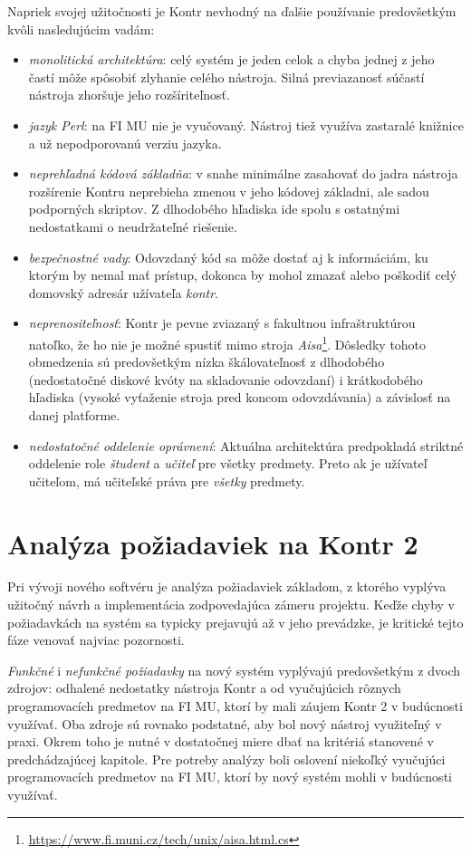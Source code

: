 \documentclass[
  digital, %
  twoside, %
  table,   %
  lof,     %
  lot,     %
]{fithesis3}
\begin{document}
Napriek svojej užitočnosti je Kontr nevhodný na ďalšie používanie predovšetkým kvôli nasledujúcim vadám:
\begin{itemize}
    \item \emph{monolitická architektúra}: celý systém je jeden celok a chyba jednej z jeho častí môže spôsobiť zlyhanie celého nástroja. Silná previazanosť súčastí nástroja zhoršuje jeho rozšíriteľnosť.
    \item \emph{jazyk Perl}: na FI MU nie je vyučovaný. Nástroj tiež využíva zastaralé knižnice a už nepodporovanú verziu jazyka. 
    \item \emph{neprehľadná kódová základňa}: v snahe minimálne zasahovať do jadra nástroja rozšírenie Kontru neprebieha zmenou v jeho kódovej základni, ale sadou podporných skriptov. Z dlhodobého hľadiska ide spolu s ostatnými nedostatkami o neudržateľné riešenie.
    \item\emph{bezpečnostné vady}: Odovzdaný kód sa môže dostať aj k informáciám, ku ktorým by nemal mať prístup, dokonca by mohol zmazať alebo poškodiť celý domovský adresár užívateľa \textit{kontr}.
    \item \emph{neprenositeľnosť}: Kontr je pevne zviazaný s fakultnou infraštruktúrou natoľko, že ho nie je možné spustiť mimo stroja \textit{Aisa}\footnote{\url{https://www.fi.muni.cz/tech/unix/aisa.html.cs}}. Dôsledky tohoto obmedzenia sú predovšetkým nízka škálovateľnosť z dlhodobého (nedostatočné diskové kvóty na skladovanie odovzdaní) i krátkodobého hľadiska (vysoké vyťaženie stroja pred koncom odovzdávania) a závislosť na danej platforme.
    \item \emph{nedostatočné oddelenie oprávnení}: Aktuálna architektúra predpokladá striktné oddelenie role \emph{študent} a \emph{učiteľ} pre všetky predmety. Preto ak je užívateľ učiteľom, má učiteľské práva pre \emph{všetky} predmety.
\end{itemize}

\chapter{Analýza požiadaviek na Kontr 2}

Pri vývoji nového softvéru je analýza požiadaviek základom, z ktorého vyplýva užitočný návrh a implementácia zodpovedajúca zámeru projektu. Keďže chyby v požiadavkách na systém sa typicky prejavujú až v jeho prevádzke, je kritické tejto fáze venovať najviac pozornosti. 

\emph{Funkčné} i \emph{nefunkčné požiadavky} na nový systém vyplývajú predovšetkým z dvoch zdrojov: odhalené nedostatky nástroja Kontr a od vyučujúcich rôznych programovacích predmetov na FI MU, ktorí by mali záujem Kontr 2 v budúcnosti využívať. Oba zdroje sú rovnako podstatné, aby bol nový nástroj využiteľný v praxi. Okrem toho je nutné v dostatočnej miere dbať na kritériá stanovené v predchádzajúcej kapitole. Pre potreby analýzy boli oslovení niekoľký vyučujúci programovacích predmetov na FI MU, ktorí by nový systém mohli v budúcnosti využívať. 
\end{document}
